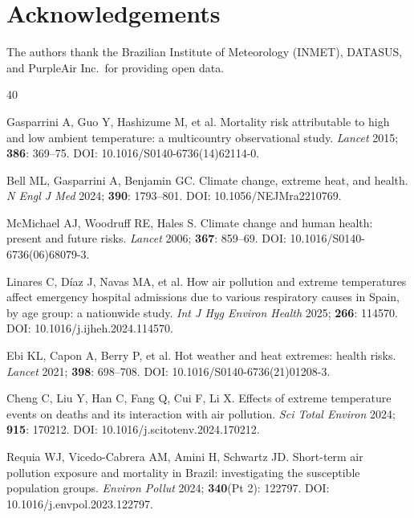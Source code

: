 \documentclass[review,number]{elsarticle}
\begin{document}
\section*{Acknowledgements}
The authors thank the Brazilian Institute of Meteorology (INMET),
DATASUS, and PurpleAir Inc.\ for providing open data.

\begin{thebibliography}{40}


Gasparrini A, Guo Y, Hashizume M, et al.
Mortality risk attributable to high and low ambient temperature: a multicountry observational study.
\textit{Lancet} 2015; \textbf{386}: 369--75.
DOI: 10.1016/S0140-6736(14)62114-0.

Bell ML, Gasparrini A, Benjamin GC.
Climate change, extreme heat, and health.
\textit{N Engl J Med} 2024; \textbf{390}: 1793--801.
DOI: 10.1056/NEJMra2210769.

McMichael AJ, Woodruff RE, Hales S.
Climate change and human health: present and future risks.
\textit{Lancet} 2006; \textbf{367}: 859--69.
DOI: 10.1016/S0140-6736(06)68079-3.

Linares C, D\'{i}az J, Navas MA, et al.
How air pollution and extreme temperatures affect emergency hospital admissions due to various respiratory causes in Spain, by age group: a nationwide study.
\textit{Int J Hyg Environ Health} 2025; \textbf{266}: 114570.
DOI: 10.1016/j.ijheh.2024.114570.

Ebi KL, Capon A, Berry P, et al.
Hot weather and heat extremes: health risks.
\textit{Lancet} 2021; \textbf{398}: 698--708.
DOI: 10.1016/S0140-6736(21)01208-3.

Cheng C, Liu Y, Han C, Fang Q, Cui F, Li X.
Effects of extreme temperature events on deaths and its interaction with air pollution.
\textit{Sci Total Environ} 2024; \textbf{915}: 170212.
DOI: 10.1016/j.scitotenv.2024.170212.

Requia WJ, Vicedo-Cabrera AM, Amini H, Schwartz JD.
Short-term air pollution exposure and mortality in Brazil: investigating the susceptible population groups.
\textit{Environ Pollut} 2024; \textbf{340}(Pt 2): 122797.
DOI: 10.1016/j.envpol.2023.122797.


\end{thebibliography}
\end{document}
